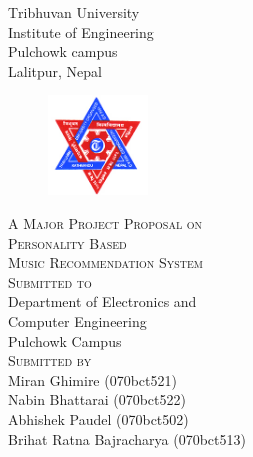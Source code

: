 \documentclass[a4paper,12pt]{article}
\begin{document}
\begin{titlepage}
  \begin{center}
    {\Huge\textsc Tribhuvan University}\\
    [0.03in]
    {\LARGE\textsc Institute of Engineering}\\
    [0.05in]
    {\Large\textsc Pulchowk campus}\\
    [0.02in]
    {\large\textsc Lalitpur, Nepal}\\
    [0.2in]
\begin{figure}[ht!]
  \centering
  \includegraphics[width=100px]{figs/tu-logo.jpg}
\end{figure}
    {\LARGE \textsc{A Major Project Proposal on}}\\
    [0.5cm]
    {\Large \textsc{Personality Based \\
    Music Recommendation System}}\\
    [1.8in]
    
    {\LARGE\textsc{Submitted to}}\\
    [0.05in]
    {\large Department of Electronics and }\\
    {\large Computer Engineering}\\
    {\large Pulchowk Campus}\\
    [1in]

    {\LARGE \textsc{\large Submitted by}}\\
    [0.05in]
    {\large Miran Ghimire (070bct521)}\\
    [0.05in]
    {\large Nabin Bhattarai (070bct522)}\\
    [0.05in]
    {\large Abhishek Paudel (070bct502)}\\
    [0.05in]
    {\large Brihat Ratna Bajracharya (070bct513)}\\
    [0.05in]
  \end{center}
\end{titlepage}
\end{document}
